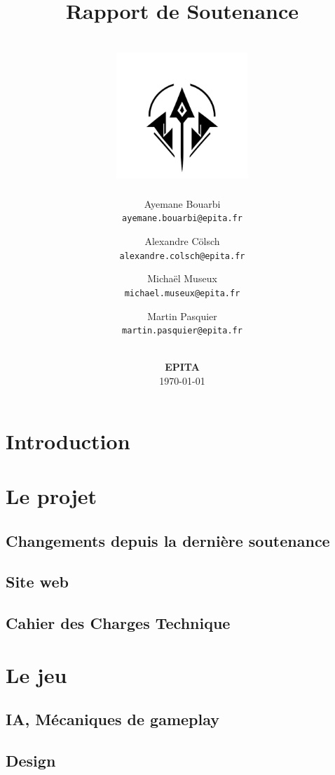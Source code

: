 \documentclass[12pt]{article}
\title{
    Rapport de Soutenance \\
    \textbf{\gameName} \\
    \vspace{0.5cm}
    \includegraphics[width=5cm]{0.format/logo.png}
    \vspace{4.2cm}
}
\author{
    Ayemane Bouarbi \\
    \texttt{ayemane.bouarbi@epita.fr}
    \vspace{0.5cm}\and
    Alexandre Cölsch \\
    \texttt{alexandre.colsch@epita.fr}
    \vspace{0.5cm}\and
    Michaël Museux \\
    \texttt{michael.museux@epita.fr}
    \vspace{0.5cm}\and
    Martin Pasquier \\
    \texttt{martin.pasquier@epita.fr}
}
\date{
    \vspace{1.5cm}
    \textbf{\companyName} \\
    \vspace{0.3cm}
    \textbf{EPITA} \\
    \vspace{1.5cm}
    \today
}
\begin{document}
\begin{titlepage}
    \maketitle
    \thispagestyle{empty} %
\end{titlepage}

\newpage
\thispagestyle{empty}
\mbox{}

\newpage
\tableofcontents

\newpage
\section{Introduction}



\newpage
\section{Le projet}

\subsection{Changements depuis la dernière soutenance}


\subsection{Site web}


\subsection{Cahier des Charges Technique}



\newpage
\section{Le jeu}

\subsection{IA, Mécaniques de gameplay}


\subsection{Design}

\end{document}
